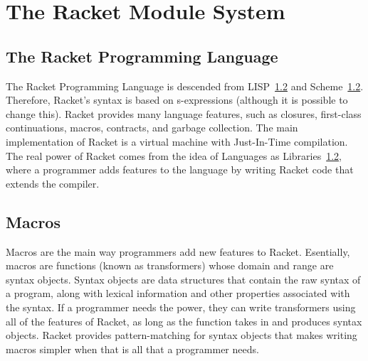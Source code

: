 \chapter{The Racket Module System}
\label{chap:module-system}

\section{The Racket Programming Language}
The Racket Programming Language is descended from LISP~\ref{} and Scheme~\ref{}.
Therefore, Racket's syntax is based on s-expressions (although it is possible to change this).
Racket provides many language features, such as closures, first-class continuations, macros, contracts, and garbage collection.
The main implementation of Racket is a virtual machine with Just-In-Time compilation. 
The real power of Racket comes from the idea of Languages as Libraries~\ref{}, where a programmer adds features to the language by writing Racket code that extends the compiler.

\section{Macros}
Macros are the main way programmers add new features to Racket. 
Esentially, macros are functions (known as transformers) whose domain and range are syntax objects.
Syntax objects are data structures that contain the raw syntax of a program, along with lexical information and other properties associated with the syntax.
If a programmer needs the power, they can write transformers using all of the features of Racket, as long as the function takes in and produces syntax objects.
Racket provides pattern-matching for syntax objects that makes writing macros simpler when that is all that a programmer needs.

